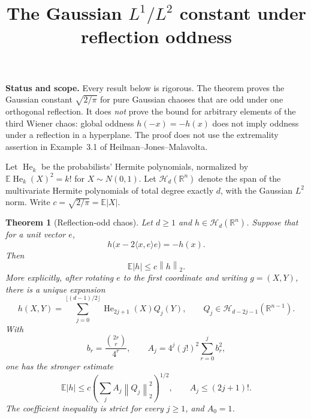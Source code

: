 \documentclass[11pt]{article}
\title{The Gaussian $L^1/L^2$ constant under reflection oddness}
\author{}
\date{}
\newtheorem{theorem}{Theorem}
\newcommand{\E}{\mathbb E}
\newcommand{\R}{\mathbb R}
\newcommand{\Hh}{\mathcal H}
\newcommand{\He}{\operatorname{He}}
\newcommand{\norm}[1]{\left\lVert #1\right\rVert}
\begin{document}
\maketitle

\noindent\textbf{Status and scope.}
Every result below is rigorous.  The theorem proves the Gaussian constant
$\sqrt{2/\pi}$ for pure Gaussian chaoses that are odd under one orthogonal
reflection.  It does \emph{not} prove the bound for arbitrary elements of the
third Wiener chaos: global oddness $h(-x)=-h(x)$ does not imply oddness under a
reflection in a hyperplane.  The proof does not use the extremality assertion
in Example~3.1 of Heilman--Jones--Malavolta.

Let $\He_k$ be the probabilists' Hermite polynomials, normalized by
$\E\He_k(X)^2=k!$ for $X\sim N(0,1)$.  Let $\Hh_d(\R^n)$ denote the span of
the multivariate Hermite polynomials of total degree exactly $d$, with the
Gaussian $L^2$ norm.  Write $c=\sqrt{2/\pi}=\E|X|$.

\begin{theorem}[Reflection-odd chaos]\label{thm:reflection}
Let $d\geq1$ and $h\in\Hh_d(\R^n)$.  Suppose that for a unit vector $e$,
\[
 h\bigl(x-2\langle x,e\rangle e\bigr)=-h(x).
\]
Then
\[
 \E|h|\leq c\norm{h}_2.
\]
More explicitly, after rotating $e$ to the first coordinate and writing
$g=(X,Y)$, there is a unique expansion
\[
 h(X,Y)=\sum_{j=0}^{\lfloor(d-1)/2\rfloor}
     \He_{2j+1}(X)Q_j(Y),\qquad
 Q_j\in\Hh_{d-2j-1}(\R^{n-1}).
\]
With
\[
 b_r=\frac{\binom{2r}{r}}{4^r},\qquad
 A_j=4^j(j!)^2\sum_{r=0}^j b_r^2,
\]
one has the stronger estimate
\begin{equation}\label{eq:strong}
 \E|h|\leq c\left(\sum_j A_j\norm{Q_j}_2^2\right)^{1/2},
 \qquad
 A_j\leq(2j+1)!.
\end{equation}
The coefficient inequality is strict for every $j\geq1$, and $A_0=1$.
\end{theorem}
\end{document}
